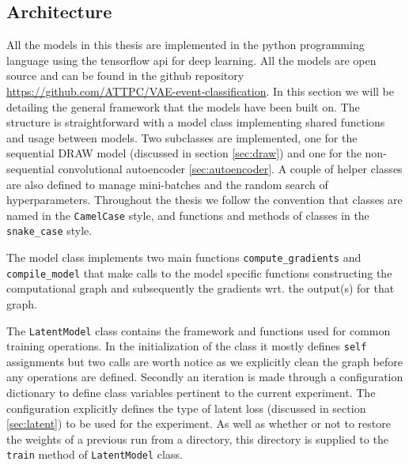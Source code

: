\subsection{Architecture}

All the models in this thesis are implemented in the python programming language using the tensorflow api for deep learning. All the models are open source and can be found in the github repository \url{https://github.com/ATTPC/VAE-event-classification}. In this section we will be detailing the general framework that the models have been built on. The structure is straightforward with a model class implementing shared functions and usage between models. Two subclasses are implemented, one for the sequential DRAW model (discussed in section \ref{sec:draw}) and one for the non-sequential convolutional autoencoder \ref{sec:autoencoder}. A couple of helper classes are also defined to manage mini-batches and the random search of hyperparameters. Throughout the thesis we follow the convention that classes are named in the \lstinline{CamelCase} style, and functions and methods of classes in the \lstinline{snake_case} style.  

The model class implements two main functions \lstinline{compute_gradients} and \lstinline{compile_model} that make calls to the model specific functions constructing the computational graph and subsequently the gradients wrt. the output(s) for that graph. 

The \lstinline{LatentModel} class contains the framework and functions used for common training operations. In the initialization of the class it mostly defines \lstinline{self} assignments but two calls are worth notice as we explicitly clean the graph before any operations are defined. Secondly an iteration is made through a configuration dictionary to define class variables pertinent to the current experiment. The configuration explicitly defines the type of latent loss (discussed in section \ref{sec:latent}) to be used for the experiment. As well as whether or not to restore the weights of a previous run from a directory, this directory is supplied to the \lstinline{train} method of \lstinline{LatentModel} class. 

% 

